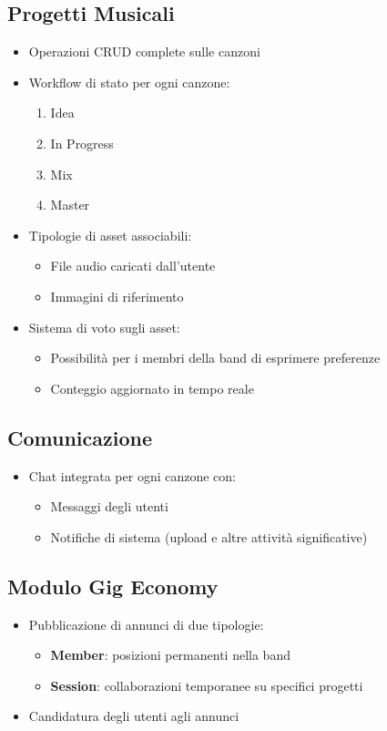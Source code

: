 \documentclass{report}
\begin{document}
\subsection{Progetti Musicali}
\begin{itemize}
    \item Operazioni CRUD complete sulle canzoni
    \item Workflow di stato per ogni canzone:
    \begin{enumerate}
        \item Idea
        \item In Progress
        \item Mix
        \item Master
    \end{enumerate}
    \item Tipologie di asset associabili:
    \begin{itemize}
        \item File audio caricati dall'utente
        \item Immagini di riferimento
    \end{itemize}
    \item Sistema di voto sugli asset:
    \begin{itemize}
        \item Possibilità per i membri della band di esprimere preferenze
        \item Conteggio aggiornato in tempo reale
    \end{itemize}
\end{itemize}

\subsection{Comunicazione}
\begin{itemize}
    \item Chat integrata per ogni canzone con:
    \begin{itemize}
        \item Messaggi degli utenti
        \item Notifiche di sistema (upload e altre attività significative)
    \end{itemize}
\end{itemize}

\subsection{Modulo Gig Economy}
\begin{itemize}
    \item Pubblicazione di annunci di due tipologie:
    \begin{itemize}
        \item \textbf{Member}: posizioni permanenti nella band
        \item \textbf{Session}: collaborazioni temporanee su specifici progetti
    \end{itemize}
    \item Candidatura degli utenti agli annunci
\end{itemize}
\end{document}
